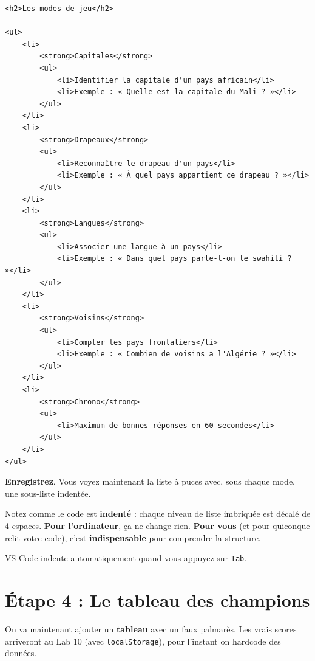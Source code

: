 \documentclass[11pt,a4paper]{article}
\newcommand{\cmark}{\ding{51}}
\begin{document}
\begin{lstlisting}[language=HTML5]
<h2>Les modes de jeu</h2>

<ul>
    <li>
        <strong>Capitales</strong>
        <ul>
            <li>Identifier la capitale d'un pays africain</li>
            <li>Exemple : « Quelle est la capitale du Mali ? »</li>
        </ul>
    </li>
    <li>
        <strong>Drapeaux</strong>
        <ul>
            <li>Reconnaître le drapeau d'un pays</li>
            <li>Exemple : « À quel pays appartient ce drapeau ? »</li>
        </ul>
    </li>
    <li>
        <strong>Langues</strong>
        <ul>
            <li>Associer une langue à un pays</li>
            <li>Exemple : « Dans quel pays parle-t-on le swahili ? »</li>
        </ul>
    </li>
    <li>
        <strong>Voisins</strong>
        <ul>
            <li>Compter les pays frontaliers</li>
            <li>Exemple : « Combien de voisins a l'Algérie ? »</li>
        </ul>
    </li>
    <li>
        <strong>Chrono</strong>
        <ul>
            <li>Maximum de bonnes réponses en 60 secondes</li>
        </ul>
    </li>
</ul>
\end{lstlisting}

\textbf{Enregistrez}. Vous voyez maintenant la liste à puces avec, sous
chaque mode, une sous-liste indentée. \cmark

\begin{retenirbox}
Notez comme le code est \textbf{indenté} : chaque niveau de liste imbriquée
est décalé de 4 espaces. \textbf{Pour l'ordinateur}, ça ne change rien.
\textbf{Pour vous} (et pour quiconque relit votre code), c'est
\textbf{indispensable} pour comprendre la structure.

VS Code indente automatiquement quand vous appuyez sur \texttt{Tab}.
\end{retenirbox}

\newpage

\section{Étape 4 : Le tableau des champions}

On va maintenant ajouter un \textbf{tableau} avec un faux palmarès. Les
vrais scores arriveront au Lab 10 (avec \texttt{localStorage}), pour
l'instant on hardcode des données.
\end{document}
